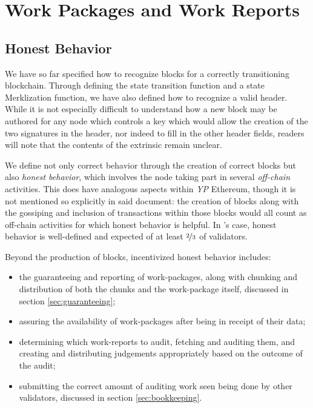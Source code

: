 \section{Work Packages and Work Reports}\label{sec:workpackagesandworkreports}

\newcommand*{\newavailabilityspecifier}{A}
\newcommand*{\itemtoresult}{C}
\newcommand*{\countupexports}{I}
\newcommand*{\importsegmentdata}{M}
\newcommand*{\pagedproofs}{P}
\newcommand*{\marshallrefine}{R}
\newcommand*{\extrinsicdata}{X}
\newcommand*{\wpX}{p}
\newcommand*{\wiX}{w}

\subsection{Honest Behavior}

We have so far specified how to recognize blocks for a correctly transitioning \Jam blockchain. Through defining the state transition function and a state Merklization function, we have also defined how to recognize a valid header. While it is not especially difficult to understand how a new block may be authored for any node which controls a key which would allow the creation of the two signatures in the header, nor indeed to fill in the other header fields, readers will note that the contents of the extrinsic remain unclear.

We define not only correct behavior through the creation of correct blocks but also \emph{honest behavior}, which involves the node taking part in several \emph{off-chain} activities. This does have analogous aspects within \emph{YP} Ethereum, though it is not mentioned so explicitly in said document: the creation of blocks along with the gossiping and inclusion of transactions within those blocks would all count as off-chain activities for which honest behavior is helpful. In \Jam's case, honest behavior is well-defined and expected of at least $\nicefrac{2}{3}$ of validators.

Beyond the production of blocks, incentivized honest behavior includes:
\begin{itemize}
    \item the guaranteeing and reporting of work-packages, along with chunking and distribution of both the chunks and the work-package itself, discussed in section \ref{sec:guaranteeing};
    \item assuring the availability of work-packages after being in receipt of their data;
    \item determining which work-reports to audit, fetching and auditing them, and creating and distributing judgements appropriately based on the outcome of the audit;
    \item submitting the correct amount of auditing work seen being done by other validators, discussed in section \ref{sec:bookkeeping}.
\end{itemize}

